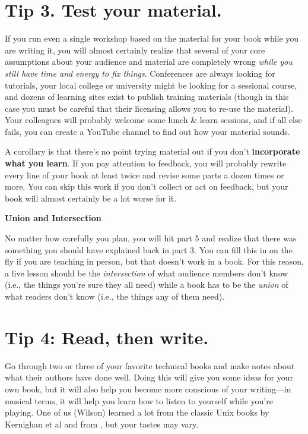 \documentclass[10pt,letterpaper]{article}
\begin{document}
\section*{Tip 3. Test your material.}

If you run even a single workshop based on the material for your book
while you are writing it,
you will almost certainly realize that
several of your core assumptions about your audience and material are completely wrong
\emph{while you still have time and energy to fix things}.
Conferences are always looking for tutorials,
your local college or university might be looking for a sessional course,
and dozens of learning sites exist to publish training materials
(though in this case you must be careful that
their licensing allows you to re-use the material).
Your colleagues will probably welcome some lunch \& learn sessions,
and if all else fails,
you can create a YouTube channel to find out how your material sounds.

A corollary is that
there's no point trying material out if you don't \textbf{incorporate what you learn}.
If you pay attention to feedback,
you will probably rewrite every line of your book at least twice
and revise some parts a dozen times or more.
You can skip this work if you don't collect or act on feedback,
but your book will almost certainly be a lot worse for it.

\begin{mdframed}
\textbf{Union and Intersection}

\noindent
No matter how carefully you plan,
you will hit part 5 and realize that
there was something you should have explained back in part 3.
You can fill this in on the fly if you are teaching in person,
but that doesn't work in a book.
For this reason,
a live lesson should be the \emph{intersection} of what audience members don't know
(i.e., the things you're sure they all need)
while a book has to be the \emph{union} of what readers don't know
(i.e., the things any of them need).
\end{mdframed}

\section*{Tip 4: Read, then write.}

Go through two or three of your favorite technical books
and make notes about what their authors have done well.
Doing this will give you some ideas for your own book,
but it will also help you become more conscious of your writing—in musical terms,
it will help you learn how to listen to yourself while you're playing.
One of us (Wilson) learned a lot from the classic Unix books by Kernighan et al
\cite{Ke1979,Ke1981,Ke1983,Ke1988} and from \cite{Ud1999},
but your tastes may vary.
\end{document}
